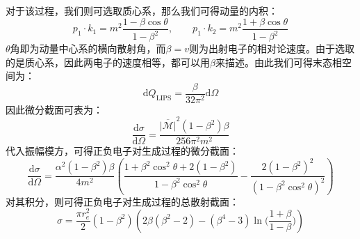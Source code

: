 对于该过程，我们则可选取质心系，那么我们可得动量的内积：
\begin{equation}
p_1\cdot k_1=m^2\frac{1-\beta\cos\theta}{1-\beta^2},\qquad p_1\cdot k_2=m^2\frac{1+\beta\cos\theta}{1-\beta^2}
\end{equation}
$\theta$角即为动量中心系的横向散射角，而$\beta=v$则为出射电子的相对论速度。由于选取的是质心系，因此两电子的速度相等，都可以用$\beta$来描述。由此我们可得末态相空间为：
\begin{equation}
\mathrm{d}Q_\text{LIPS}=\frac{\beta}{32\pi^2}\mathrm{d}\Omega
\end{equation}
因此微分截面可表为：
\begin{equation}
\frac{\mathrm{d}\sigma}{\mathrm{d}\Omega}=\frac{\overline{|\mathcal{M}|}^2(1-\beta^2)\beta}{256\pi^2m^2}
\end{equation}
代入振幅模方，可得正负电子对生成过程的微分截面：
\begin{equation}
\frac{\mathrm{d}\sigma}{\mathrm{d}\Omega}=\frac{\alpha^2(1-\beta^2)\beta}{4m^2}\left(\frac{1+\beta^2\cos^2\theta+2(1-\beta^2)}{1-\beta^2\cos^2\theta}-\frac{2(1-\beta^2)^2}{(1-\beta^2\cos^2\theta)^2}\right)
\end{equation}
对其积分，则可得正负电子对生成过程的总散射截面：
\begin{equation}
\sigma=\frac{\pi r_e^2}{2}(1-\beta^2)\left(2\beta(\beta^2-2)-(\beta^4-3)\ln\Big(\frac{1+\beta}{1-\beta}\Big)\right)
\end{equation}

